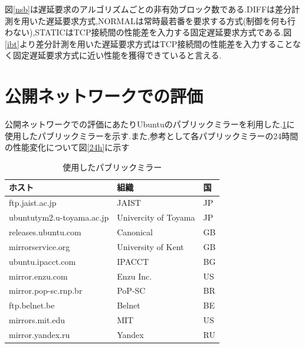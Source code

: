 \documentclass[a4j,12pt]{gradthesis_utf8}
\begin{document}
図\ref{nsb}は遅延要求のアルゴリズムごとの非有効ブロック数である.DIFFは差分計測を用いた遅延要求方式,NORMALは常時最若番を要求する方式(制御を何も行わない),STATICはTCP接続間の性能差を入力する固定遅延要求方式である.図\ref{ibt}より差分計測を用いた遅延要求方式はTCP接続間の性能差を入力することなく固定遅延要求方式に近い性能を獲得できていると言える.

\newpage

\section{公開ネットワークでの評価}
\label{pub}
公開ネットワークでの評価にあたりUbuntuのパブリックミラーを利用した.\ref{tablemirror}に使用したパブリックミラーを示す.また,参考として各パブリックミラーの24時間の性能変化について図\ref{24h}に示す
\begin{table}[htb]
	\begin{center}
		\caption{使用したパブリックミラー}
		\label{tablemirror}
		\begin{tabular}{|l|l|l|} \hline
			ホスト & 組織 & 国\\ \hline \hline
			ftp.jaist.ac.jp & JAIST & JP \\
			ubuntutym2.u-toyama.ac.jp & Univercity of Toyama & JP \\
			releases.ubuntu.com & Canonical & GB \\
			mirrorservice.org & University of Kent & GB \\
			ubuntu.ipacct.com & IPACCT & BG \\
			mirror.enzu.com & Enzu Inc. & US \\
			mirror.pop-sc.rnp.br & PoP-SC & BR \\
			ftp.belnet.be & Belnet & BE \\
			mirrors.mit.edu & MIT & US \\
			mirror.yandex.ru & Yandex & RU \\ \hline
		\end{tabular}
	\end{center}
\end{table}
\end{document}
